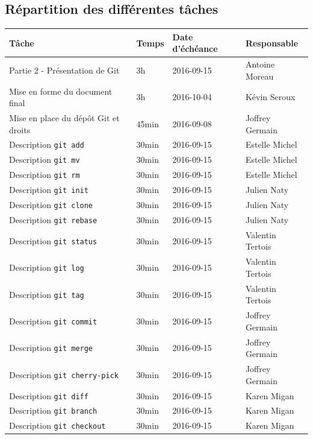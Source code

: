 \documentclass[11pt,canadien]{article}
\begin{document}
\newpage
\begin{appendices} %

\section{Répartition des différentes tâches}
\begin{tabular}{l l l l}
	\textbf{Tâche} & \textbf{Temps} & \textbf{Date d'échéance} & \textbf{Responsable}
	\\ \hline
	   Partie 2 - Présentation de Git       & 3h    & 2016-09-15 & Antoine Moreau
	\\ Mise en forme du document final      & 3h    & 2016-10-04 & Kévin Seroux
	\\ Mise en place du dépôt Git et droits & 45min & 2016-09-08 & Joffrey Germain
	\\ Description \texttt{git add}         & 30min & 2016-09-15 & Estelle Michel
	\\ Description \texttt{git mv}          & 30min & 2016-09-15 & Estelle Michel
	\\ Description \texttt{git rm}          & 30min & 2016-09-15 & Estelle Michel
	\\ Description \texttt{git init}        & 30min & 2016-09-15 & Julien Naty
	\\ Description \texttt{git clone}       & 30min & 2016-09-15 & Julien Naty
	\\ Description \texttt{git rebase}      & 30min & 2016-09-15 & Julien Naty
	\\ Description \texttt{git status}      & 30min & 2016-09-15 & Valentin Tertois
	\\ Description \texttt{git log}         & 30min & 2016-09-15 & Valentin Tertois
	\\ Description \texttt{git tag}         & 30min & 2016-09-15 & Valentin Tertois
	\\ Description \texttt{git commit}      & 30min & 2016-09-15 & Joffrey Germain
	\\ Description \texttt{git merge}       & 30min & 2016-09-15 & Joffrey Germain
	\\ Description \texttt{git cherry-pick} & 30min & 2016-09-15 & Joffrey Germain
	\\ Description \texttt{git diff}        & 30min & 2016-09-15 & Karen Migan
	\\ Description \texttt{git branch}      & 30min & 2016-09-15 & Karen Migan
	\\ Description \texttt{git checkout}    & 30min & 2016-09-15 & Karen Migan

\end{tabular}
\end{appendices}
\end{document}

